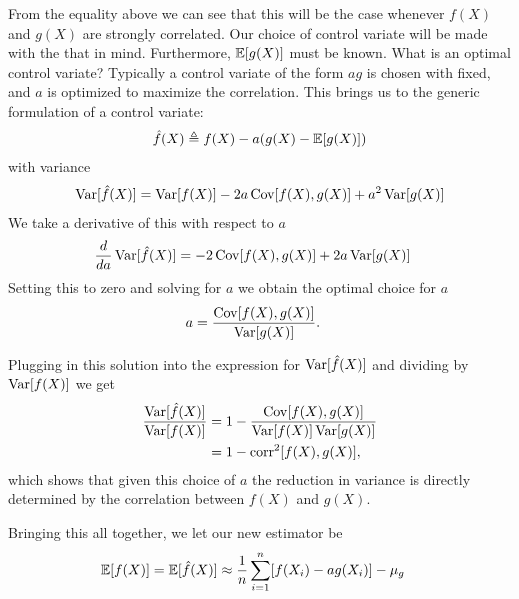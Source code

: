 From the equality above we can see that this will be the case whenever $f(X)$ and $g(X)$ are strongly correlated. Our choice of control variate will be made with the that in mind. Furthermore, $\operatorname{\mathbb{E}} [ g(X) ]$ must be known. What is an optimal control variate? Typically a control variate of the form $ag$ is chosen with fixed, and $a$ is optimized to maximize the correlation. This brings us to the generic formulation of a control variate:
\begin{align*}
    \hat{f}(X) \triangleq f(X) - a(g(X) - \operatorname{\mathbb{E}} [ g(X) ])
\end{align*}
with variance
\begin{align*}
  \operatorname{Var} [ \hat{f}(X) ] = \operatorname{Var} [ f(X) ] - 2a  \operatorname{Cov} [ f(X), g(X) ] + a^2 \operatorname{Var} [ g(X) ]
\end{align*}
We take a derivative of this with respect to $a$
\begin{align*}
    \frac{d}{d a}\operatorname{Var} [ \hat{f}(X) ] &= - 2  \operatorname{Cov} [ f(X), g(X) ] + 2a \operatorname{Var} [ g(X) ]
\end{align*}
Setting this to zero and solving for $a$ we obtain the optimal choice for $a$
\begin{align}
\label{eq:cv-scale}
  a &= \frac{ \operatorname{Cov} [ f(X), g(X) ]}{ \operatorname{Var} [ g(X) ]}.
\end{align}

Plugging in this solution into the expression for $\operatorname{Var} [ \hat{f}(X) ]$ and dividing by $\operatorname{Var} [ f(X) ]$ we get
\begin{align}
\label{eq:var-red}
  \frac{\operatorname{Var} [ \hat{f}(X) ]}{\operatorname{Var} [ f(X) ]}
    &= 1 - \frac{\operatorname{Cov}[ f(X), g(X) ]}{ \operatorname{Var} [ f(X) ]  \operatorname{Var} [ g(X) ]} \\
    &= 1 - \operatorname{corr}^2 [ f(X), g(X) ],
\end{align}
which shows that given this choice of $a$ the reduction in variance is directly determined by the correlation between $f(X)$ and $g(X)$.

Bringing this all together, we let our new estimator be
\begin{align*}
  \operatorname{\mathbb{E}} [ f(X) ]
    &= \operatorname{\mathbb{E}} [ \hat{f}(X) ] \approx \frac{1}{n} \sum_{i=1}^n [ f(X_i) - ag(X_i) ] - \mu_{g}
\end{align*}

